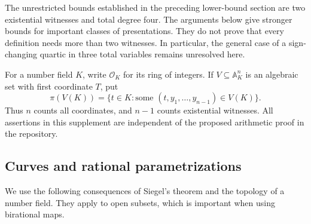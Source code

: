 \documentclass[11pt]{article}
\theoremstyle{definition}
\begin{document}
The unrestricted bounds established in the preceding lower-bound section are two existential
witnesses and total degree four.  The arguments below give stronger bounds
for important classes of presentations.  They do not prove that every
definition needs more than two witnesses.  In particular, the general case
of a sign-changing quartic in three total variables remains unresolved here.

For a number field $K$, write $\mathcal O_K$ for its ring of integers.
If $V\subseteq\mathbb A^n_K$ is an algebraic set with first coordinate $T$,
put
\[
 \pi(V(K))=\{t\in K:\text{some }(t,y_1,\ldots,y_{n-1})\in V(K)\}.
\]
Thus $n$ counts all coordinates, and $n-1$ counts existential witnesses.
All assertions in this supplement are independent of the proposed
arithmetic proof in the repository.

\subsection{Curves and rational parametrizations}

We use the following consequences of Siegel's theorem and the topology
of a number field.  They apply to open subsets, which is important when
using birational maps.
\end{document}

